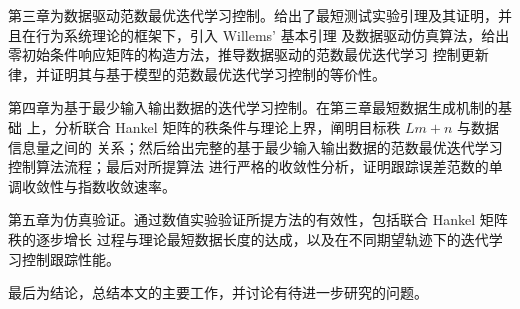 第三章为数据驱动范数最优迭代学习控制。给出了最短测试实验引理及其证明，并且在行为系统理论的框架下，引入 Willems' 基本引理
及数据驱动仿真算法，给出零初始条件响应矩阵的构造方法，推导数据驱动的范数最优迭代学习
控制更新律，并证明其与基于模型的范数最优迭代学习控制的等价性。

第四章为基于最少输入输出数据的迭代学习控制。在第三章最短数据生成机制的基础
上，分析联合 Hankel 矩阵的秩条件与理论上界，阐明目标秩 $Lm+n$ 与数据信息量之间的
关系；然后给出完整的基于最少输入输出数据的范数最优迭代学习控制算法流程；最后对所提算法
进行严格的收敛性分析，证明跟踪误差范数的单调收敛性与指数收敛速率。

第五章为仿真验证。通过数值实验验证所提方法的有效性，包括联合 Hankel 矩阵秩的逐步增长
过程与理论最短数据长度的达成，以及在不同期望轨迹下的迭代学习控制跟踪性能。

最后为结论，总结本文的主要工作，并讨论有待进一步研究的问题。